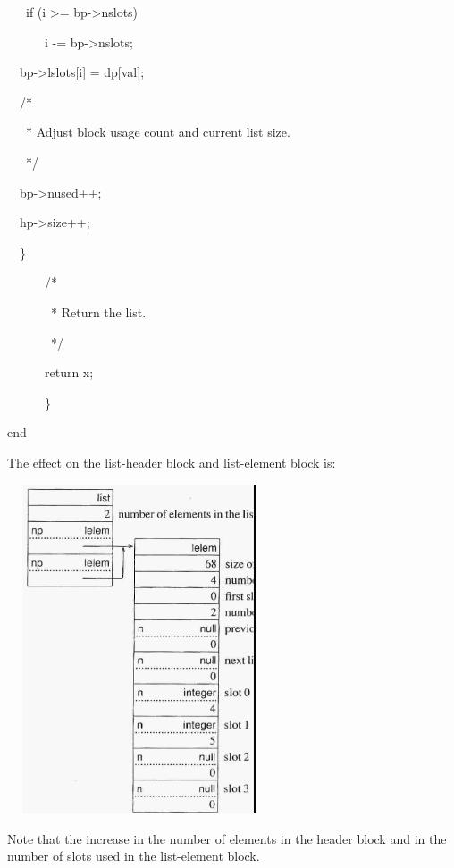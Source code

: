 {\ttfamily\mdseries
\ \ \ if (i {\textgreater}= bp-{\textgreater}nslots)}

{\ttfamily\mdseries
\ \ \ \ \ \ i -= bp-{\textgreater}nslots;}

{\ttfamily\mdseries
\ \  bp-{\textgreater}lslots[i] = dp[val];}


\bigskip

{\ttfamily\mdseries
\ \  /*}

{\ttfamily\mdseries
\ \  \ * Adjust block usage count and current list size.}

{\ttfamily\mdseries
\ \  \ */}

{\ttfamily\mdseries
\ \  bp-{\textgreater}nused++;}

{\ttfamily\mdseries
\ \  hp-{\textgreater}size++;}

{\ttfamily\mdseries
\ \  \}}


\bigskip

{\ttfamily\mdseries
\ \ \ \ \ \ /*}

{\ttfamily\mdseries
\ \ \ \ \ \ \ * Return the list.}

{\ttfamily\mdseries
\ \ \ \ \ \ \ */}

{\ttfamily\mdseries
\ \ \ \ \ \ return x;}

{\ttfamily\mdseries
\ \ \ \ \ \ \}}

{\ttfamily\mdseries
end}

The effect on the list-header block and list-element block is:

\ \  \includegraphics[width=2.778in,height=3.8417in]{ib-img/ib-img028.jpg} 

Note that the increase in the number of elements in the header block
and in the number of slots used in the list-element block.

